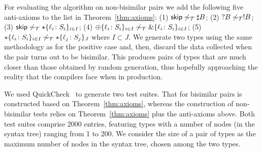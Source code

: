 For evaluating the algorithm on non-bisimilar pairs we add the 
following five anti-axioms to the list in 
Theorem~\ref{thm:axioms}:
(1) $\mathsf{skip} \not\sim_\mathcal T \sharp B$; \enspace
(2) $?B \not\sim_\mathcal T !B$; \enspace
(3) $\mathsf{skip} \not\sim_\mathcal T \star\{\ell_i\colon S_i\}_{i\in I}$; \enspace
(4) $\oplus\{\ell_i\colon S_i\}_{i\in I} \not\sim_\mathcal T \&\{\ell_i\colon S_i\}_{i\in I}$; \enspace
(5) $\star\{\ell_i\colon S_i\}_{i\in I} \not\sim_\mathcal T \star\{\ell_j\colon S_j\}_J$
where $I \subset J$.
%
We generate two types using the same methodology as for the positive
case and, then, discard the data collected when the pair turns out to
be bisimilar.
%
This produces pairs of types that are much closer than those obtained
by random generation, thus hopefully approaching the reality that the
compilers face when in production.


We used QuickCheck~\cite{DBLP:conf/icfp/ClaessenH00} to generate two
test suites. That for bisimilar pairs is constructed based on
Theorem~\ref{thm:axioms}, whereas the construction of non-bisimilar
tests relies on Theorem~\ref{thm:axioms} plus the anti-axioms
above. Both test suites comprise 2000 entries, featuring types with a
number of nodes (in the syntax tree) ranging from 1 to 200.  We
consider the size of a pair of types as the maximum number of nodes in
the syntax tree, chosen among the two types.

